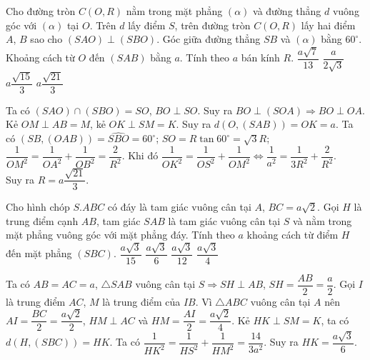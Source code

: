 \begin{ex}%
 Cho đường tròn $C(O,R)$ nằm trong mặt phẳng $(\alpha)$ và đường thẳng $d$ vuông góc với $(\alpha)$ tại $O$. Trên $d$ lấy điểm $S$, trên đường tròn $C(O,R)$ lấy hai điểm $A$, $B$ sao cho $(SAO)\perp (SBO)$. Góc giữa đường thẳng $SB$ và $(\alpha)$ bằng $60^\circ$. Khoảng cách từ $O$ đến $(SAB)$ bằng $a$. Tính theo $a$ bán kính $R$.
\choice
{$\dfrac{a\sqrt{7}}{13}$}
{$\dfrac{a}{2\sqrt{3}}$}
{$a\dfrac{\sqrt{15}}{3}$}
{\True $a\dfrac{\sqrt{21}}{3}$}
\loigiai
{
\immini
{Ta có $(SAO)\cap (SBO)=SO$, $BO\perp SO$. Suy ra $BO\perp (SOA)\Rightarrow BO\perp OA$. Kẻ $OM\perp AB=M$, kẻ $OK\perp SM=K$.
Suy ra $d(O, (SAB))=OK=a$. Ta có $(SB, (OAB))=\widehat{SBO}=60^\circ$; $SO=R\tan 60^\circ=\sqrt{3}R$;\\ $\dfrac{1}{OM^2}=\dfrac{1}{OA^2}+\dfrac{1}{OB^2}=\dfrac{2}{R^2}$.
Khi đó $\dfrac{1}{OK^2}=\dfrac{1}{OS^2}+\dfrac{1}{OM^2}\Leftrightarrow \dfrac{1}{a^2}=\dfrac{1}{3R^2}+\dfrac{2}{R^2}$.\\ 
Suy ra $R=a\dfrac{\sqrt{21}}{3}$.
}
{
}
}
\end{ex}

\begin{ex}%
 Cho hình chóp $S.ABC$ có đáy là tam giác vuông cân tại $A$, $BC=a\sqrt{2}$. Gọi $H$ là trung điểm cạnh $AB$, tam giác $SAB$ là tam giác vuông cân tại $S$ và nằm trong mặt phẳng vuông góc với mặt phẳng đáy. Tính theo $a$ khoảng cách từ điểm $H$ đến mặt phẳng $(SBC)$.
\choice
{$\dfrac{a\sqrt{3}}{15}$}
{\True $\dfrac{a\sqrt{3}}{6}$}
{$\dfrac{a\sqrt{3}}{12}$}
{$\dfrac{a\sqrt{3}}{4}$}
\loigiai
{
\immini
{Ta có $AB=AC=a$, $\triangle SAB$ vuông cân tại $S\Rightarrow SH\perp AB$, $SH=\dfrac{AB}{2}=\dfrac{a}{2}$. Gọi $I$ là trung điểm $AC$, $M$ là trung điểm của $IB$. Vì $\triangle ABC$ vuông cân tại $A$ nên $AI=\dfrac{BC}{2}=\dfrac{a\sqrt{2}}{2}$, $HM\perp AC$ và $HM=\dfrac{AI}{2}=\dfrac{a\sqrt{2}}{4}$. Kẻ $HK\perp SM=K$, ta có $d(H, (SBC))=HK$. Ta có $\dfrac{1}{HK^2}=\dfrac{1}{HS^2}+\dfrac{1}{HM^2}=\dfrac{14}{3a^2}$. Suy ra $HK=\dfrac{a\sqrt{3}}{6}$.
}
{
}
}
\end{ex}

